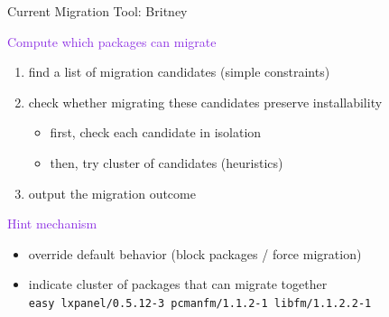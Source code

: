 \documentclass[xcolor={dvipsnames}]{beamer}
\newcommand{\EEE}[1]{\textcolor{BlueViolet}{#1}}
\begin{document}
\begin{frame}{Current Migration Tool: Britney}

\EEE{Compute which packages can migrate}
\begin{enumerate}
\item find a list of migration candidates (simple constraints)
\item check whether migrating these candidates preserve installability
\begin{itemize}
\item first, check each candidate in isolation
\item then, try cluster of candidates (heuristics)
\end{itemize}
\item output the migration outcome
\end{enumerate}

\vspace{1cm}

\EEE{Hint mechanism}
\begin{itemize}
\item override default behavior (block packages / force migration)
\item indicate cluster of packages that can migrate together \\
\texttt{easy lxpanel/0.5.12-3 pcmanfm/1.1.2-1 libfm/1.1.2.2-1}
\end{itemize}
\end{frame}
\end{document}
